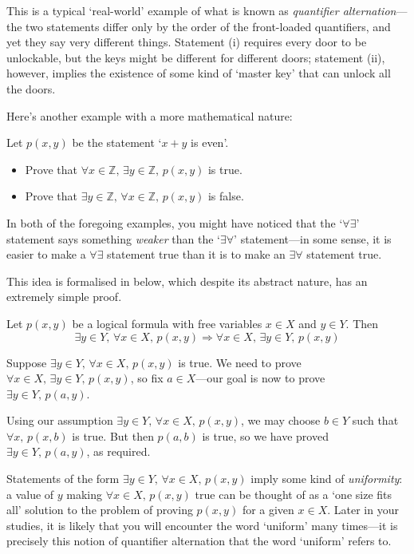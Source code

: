This is a typical `real-world' example of what is known as \textit{quantifier alternation}---the two statements differ only by the order of the front-loaded quantifiers, and yet they say very different things. Statement (i) requires every door to be unlockable, but the keys might be different for different doors; statement (ii), however, implies the existence of some kind of `master key' that can unlock all the doors.

Here's another example with a more mathematical nature:

\begin{exercise}
Let $p(x,y)$ be the statement `$x + y$ is even'.
\begin{itemize}
\item Prove that $\forall x \in \mathbb{Z},\, \exists y \in \mathbb{Z},\, p(x,y)$ is true.
\item Prove that $\exists y \in \mathbb{Z},\, \forall x \in \mathbb{Z},\, p(x,y)$ is false.
\end{itemize}
\end{exercise}

In both of the foregoing examples, you might have noticed that the `$\forall\exists$' statement says something \textit{weaker} than the `$\exists\forall$' statement---in some sense, it is easier to make a $\forall\exists$ statement true than it is to make an $\exists\forall$ statement true.

This idea is formalised in  below, which despite its abstract nature, has an extremely simple proof.

\begin{theorem}
\label{thmQuantifierAlternation}
Let $p(x,y)$ be a logical formula with free variables $x \in X$ and $y \in Y$. Then
\[\exists y \in Y,\, \forall x \in X,\, p(x,y) \Rightarrow \forall x \in X,\, \exists y \in Y,\, p(x,y)\]
\end{theorem}

\begin{cproof}
Suppose $\exists y \in Y,\, \forall x \in X,\, p(x,y)$ is true. We need to prove $\forall x \in X,\, \exists y \in Y,\, p(x,y)$, so fix $a \in X$---our goal is now to prove $\exists y \in Y,\, p(a,y)$.

Using our assumption $\exists y \in Y,\, \forall x \in X,\, p(x,y)$, we may choose $b \in Y$ such that $\forall x,\, p(x,b)$ is true. But then $p(a, b)$ is true, so we have proved $\exists y \in Y,\, p(a,y)$, as required.
\end{cproof}

Statements of the form $\exists y \in Y,\, \forall x \in X,\, p(x,y)$ imply some kind of \textit{uniformity}: a value of $y$ making $\forall x \in X,\, p(x,y)$ true can be thought of as a `one size fits all' solution to the problem of proving $p(x,y)$ for a given $x \in X$. Later in your studies, it is likely that you will encounter the word `uniform' many times---it is precisely this notion of quantifier alternation that the word `uniform' refers to.